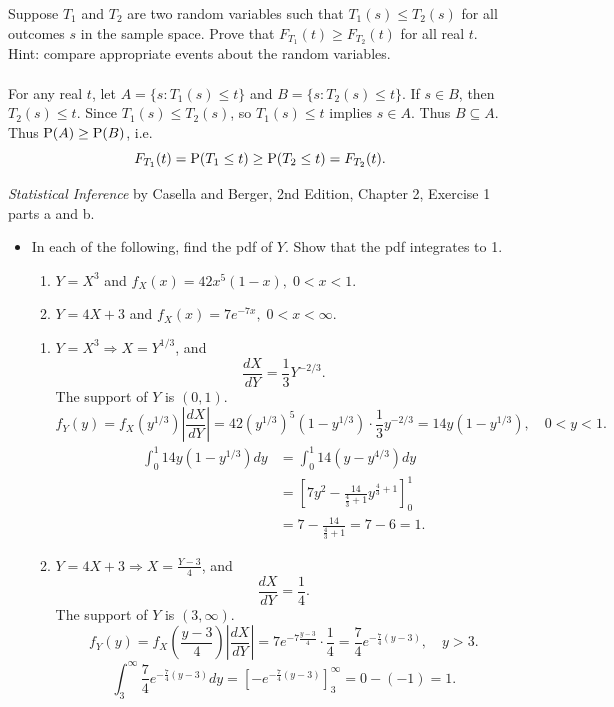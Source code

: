 \documentclass[12pt]{article}
\newcommand{\Prob}{{\rm P}}
\newenvironment{problem}[2][Problem]{\begin{trivlist}
\item[\hskip \labelsep {\bfseries #1}\hskip \labelsep {\bfseries #2.}]}
{\end{trivlist}}
\begin{document}
\pagebreak

\begin{problem}{5}
  Suppose $T_1$ and $T_2$ are two random variables such that 
  $T_1(s) \le T_2(s)$ for all outcomes $s$ in the sample space. 
  Prove that $F_{T_1}(t) \ge F_{T_2}(t)$ for all real $t$. 
  Hint: compare appropriate events about the random variables.
  \\\\
  For any real $t$, let $A = \{s: T_1(s) \le t\}$ and $B = \{s: T_2(s) \le t\}$.
  If $s \in B$, then $T_2(s) \le t$. Since $T_1(s) \le T_2(s)$,
  so $T_1(s) \le t$ implies $s \in A$. Thus $B \subseteq A$. 
  Thus $\Prob(A) \ge \Prob(B)$, i.e.
  \[
    F_{T_1}(t) = \Prob(T_1 \le t) \ge \Prob(T_2 \le t) = F_{T_2}(t).
  \]
\end{problem}

\begin{problem}{6}
  \textit{Statistical Inference} by Casella and Berger, 2nd Edition, Chapter 2, 
  Exercise 1 parts a and b.
  \begin{itemize}
    \item [1.] In each of the following, find the pdf of $Y$. Show that
    the pdf integrates to 1.
    \begin{enumerate}
      \item $Y = X^3$ and $f_X(x) = 42x^5(1-x),\;0 < x < 1$.
      \item $Y = 4X+3$ and $f_X(x) = 7e^{-7x},\;0 < x < \infty$.
    \end{enumerate}
    \begin{enumerate}
      \item $Y = X^3 \Rightarrow X = Y^{1/3}$, and
      \[
        \frac{dX}{dY} = \frac{1}{3}Y^{-2/3}.
      \]
      The support of $Y$ is $(0,1)$.
      \[
        f_Y(y) = f_X(y^{1/3}) \left|\frac{dX}{dY}\right| =
        42(y^{1/3})^5(1-y^{1/3}) \cdot \frac{1}{3}y^{-2/3} =
        14y(1-y^{1/3}),\quad 0 < y < 1.
      \]
      \[
      \begin{aligned}
        \int_0^1 14y(1-y^{1/3}) dy &= \int_0^1 14(y - y^{4/3}) dy \\
        &=\left[7y^2 - \frac{14}{\frac{4}{3}+1}y^{\frac{4}{3}+1}\right]_0^1 \\
        &=7 - \frac{14}{\frac{4}{3}+1} = 7 - 6 = 1.
      \end{aligned}
      \]
      \item $Y = 4X+3 \Rightarrow X = \frac{Y-3}{4}$, and
      \[
        \frac{dX}{dY} = \frac{1}{4}.
      \]
      The support of $Y$ is $(3,\infty)$.
      \[
        f_Y(y) = f_X\left(\frac{y-3}{4}\right) \left|\frac{dX}{dY}\right| =
        7e^{-7\frac{y-3}{4}} \cdot \frac{1}{4} =
        \frac{7}{4}e^{-\frac{7}{4}(y-3)},\quad y > 3.
      \]
      \[
        \int_3^\infty \frac{7}{4}e^{-\frac{7}{4}(y-3)} dy =
        \left[-e^{-\frac{7}{4}(y-3)}\right]_3^\infty = 0 - (-1) = 1.
      \]
    \end{enumerate}
  \end{itemize}
\end{problem}
\end{document}
